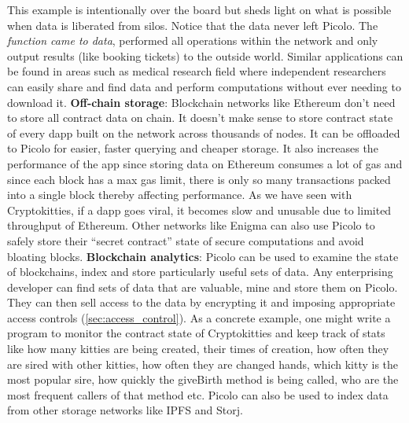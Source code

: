 This example is intentionally over the board but sheds light on what is possible when data is liberated from silos. Notice that the data never left \textsf{Picolo}. The \textit{function came to data}, performed all operations within the network and only output results (like booking tickets) to the outside world. Similar applications can be found in areas such as medical research field where independent researchers can easily share and find data and perform computations without ever needing to download it.  
\newline\newline
\textbf{Off-chain storage}: Blockchain networks like Ethereum don't need to store all contract data on chain. It doesn't make sense to store contract state of every dapp built on the network across thousands of nodes. It can be offloaded to \textsf{Picolo} for easier, faster querying and cheaper storage. It also increases the performance of the app since storing data on Ethereum consumes a lot of gas and since each block has a max gas limit, there is only so many transactions packed into a single block thereby affecting performance. As we have seen with Cryptokitties, if a dapp goes viral, it becomes slow and unusable due to limited throughput of Ethereum. Other networks like Enigma \cite{enigma} can also use \textsf{Picolo} to safely store their ``secret contract'' state of secure computations and avoid bloating blocks.
\newline\newline
\textbf{Blockchain analytics}: \textsf{Picolo} can be used to examine the state of blockchains, index and store particularly useful sets of data. Any enterprising developer can find sets of data that are valuable, mine and store them on \textsf{Picolo}. They can then sell access to the data by encrypting it and imposing appropriate access controls (\cref{sec:access_control}). As a concrete example, one might write a program to monitor the contract state of Cryptokitties and keep track of stats like how many kitties are being created, their times of creation, how often they are sired with other kitties, how often they are changed hands, which kitty is the most popular sire, how quickly the \textsf{giveBirth} method is being called, who are the most frequent callers of that method etc. \textsf{Picolo} can also be used to index data from other storage networks like IPFS and Storj. 

